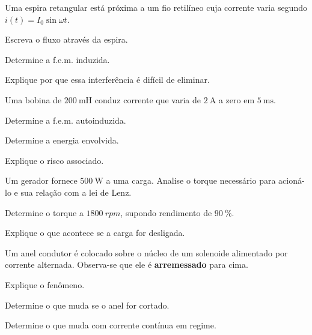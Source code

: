 \begin{questao}[3]{}

Uma espira retangular está próxima a um fio retilíneo cuja corrente varia
segundo $i(t)=I_0\sin\omega t$.
\begin{itensq}
\item Escreva o fluxo através da espira.
\item Determine a f.e.m. induzida.
\item Explique por que essa interferência é difícil de eliminar.
\end{itensq}


\end{questao}
\begin{questao}[3]{}

Uma bobina de $\SI{200}{\milli\henry}$ conduz corrente que varia de
$\SI{2}{\ampere}$ a zero em $\SI{5}{\milli\second}$.
\begin{itensq}
\item Determine a f.e.m. autoinduzida.
\item Determine a energia envolvida.
\item Explique o risco associado.
\end{itensq}


\end{questao}
\begin{questao}[3]{}

Um gerador fornece $\SI{500}{\watt}$ a uma carga. Analise o torque necessário
para acioná-lo e sua relação com a lei de Lenz.
\begin{itensq}
\item Determine o torque a $\SI{1800}{rpm}$, supondo rendimento de
      $\SI{90}{\percent}$.
\item Explique o que acontece se a carga for desligada.
\end{itensq}


\end{questao}
\begin{questao}[3]{}

Um anel condutor é colocado sobre o núcleo de um solenoide alimentado por
corrente alternada. Observa-se que ele é \textbf{arremessado} para cima.
\begin{itensq}
\item Explique o fenômeno.
\item Determine o que muda se o anel for cortado.
\item Determine o que muda com corrente contínua em regime.
\end{itensq}


\end{questao}
